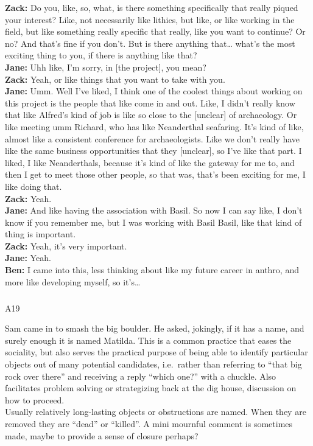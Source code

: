 \documentclass[
]{article}
\makeatletter
\let\oldsubparagraph\subparagraph
\renewcommand{\subparagraph}{
    \@ifstar
      \xxxSubParagraphStar
      \xxxSubParagraphNoStar
  }
\newcommand{\xxxSubParagraphStar}[1]{\oldsubparagraph*{#1}\mbox{}}
\newcommand{\xxxSubParagraphNoStar}[1]{\oldsubparagraph{#1}\mbox{}}
\makeatother
\begin{document}
\textbf{Zack:} Do you, like, so, what, is there something specifically
that really piqued your interest? Like, not necessarily like lithics,
but like, or like working in the field, but like something really
specific that really, like you want to continue? Or no? And that's fine
if you don't. But is there anything that\ldots{} what's the most
exciting thing to you, if there is anything like that?\\
\textbf{Jane:} Uhh like, I'm sorry, in {[}the project{]}, you mean?\\
\textbf{Zack:} Yeah, or like things that you want to take with you.\\
\textbf{Jane:} Umm. Well I've liked, I think one of the coolest things
about working on this project is the people that like come in and out.
Like, I didn't really know that like Alfred's kind of job is like so
close to the {[}unclear{]} of archaeology. Or like meeting umm Richard,
who has like Neanderthal seafaring. It's kind of like, almost like a
consistent conference for archaeologists. Like we don't really have like
the same business opportunities that they {[}unclear{]}, so I've like
that part. I liked, I like Neanderthals, because it's kind of like the
gateway for me to, and then I get to meet those other people, so that
was, that's been exciting for me, I like doing that.\\
\textbf{Zack:} Yeah.\\
\textbf{Jane:} And like having the association with Basil. So now I can
say like, I don't know if you remember me, but I was working with Basil
Basil, like that kind of thing is important.\\
\textbf{Zack:} Yeah, it's very important.\\
\textbf{Jane:} Yeah.\\
\textbf{Ben:} I came into this, less thinking about like my future
career in anthro, and more like developing myself, so it's\ldots{}

\subparagraph{A19}\label{sec-A19}

Sam came in to smash the big boulder. He asked, jokingly, if it has a
name, and surely enough it is named Matilda. This is a common practice
that eases the sociality, but also serves the practical purpose of being
able to identify particular objects out of many potential candidates,
i.e.~rather than referring to ``that big rock over there'' and receiving
a reply ``which one?'' with a chuckle. Also facilitates problem solving
or strategizing back at the dig house, discussion on how to proceed.\\
Usually relatively long-lasting objects or obstructions are named. When
they are removed they are ``dead'' or ``killed''. A mini mournful
comment is sometimes made, maybe to provide a sense of closure perhaps?
\end{document}

